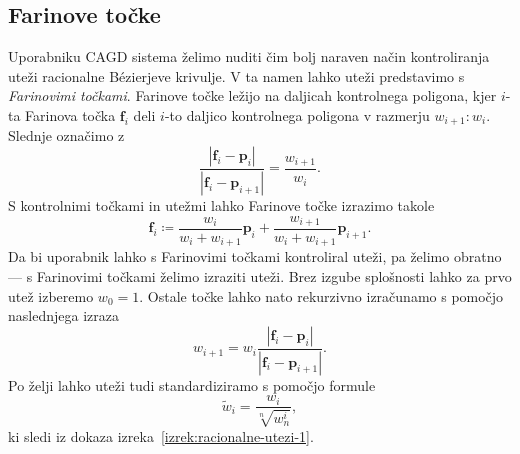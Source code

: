 \documentclass[isrm2, tisk]{fmfdelo}
\newcommand{\p}{\mathbf{p}}
\begin{document}
    \subsection{Farinove točke}
    Uporabniku CAGD sistema želimo nuditi čim bolj naraven način kontroliranja uteži racionalne Bézierjeve krivulje.
    V ta namen lahko uteži predstavimo s \textit{Farinovimi točkami}.
    Farinove točke ležijo na daljicah kontrolnega poligona, kjer $i$-ta Farinova točka $\mathbf{f}_i$ deli $i$-to daljico kontrolnega poligona v razmerju $w_{i+1}:w_{i}$.
    Slednje označimo z $$\frac{|\mathbf{f}_i-\p_i|}{|\mathbf{f}_i-\p_{i+1}|} = \frac{w_{i+1}}{w_{i}}.$$
    S kontrolnimi točkami in utežmi lahko Farinove točke izrazimo takole
    \[\mathbf{f}_i \coloneqq \frac{w_{i}}{w_{i}+w_{i+1}}\p_i +  \frac{w_{i+1}}{w_{i}+w_{i+1}}\p_{i+1}.\]
    Da bi uporabnik lahko s Farinovimi točkami kontroliral uteži, pa želimo obratno — s Farinovimi točkami želimo izraziti uteži.
    Brez izgube splošnosti lahko za prvo utež izberemo $w_0=1$.
    Ostale točke lahko nato rekurzivno izračunamo s pomočjo naslednjega izraza
    \[w_{i+1} = w_i\frac{|\mathbf{f}_i-\p_i|}{|\mathbf{f}_i-\p_{i+1}|}.\]
    Po želji lahko uteži tudi standardiziramo s pomočjo formule \[\tilde{w}_{i} = \frac{w_i}{\sqrt[n]{w_n^i}},\]
    ki sledi iz dokaza izreka~\ref{izrek:racionalne-utezi-1}.
\end{document}
